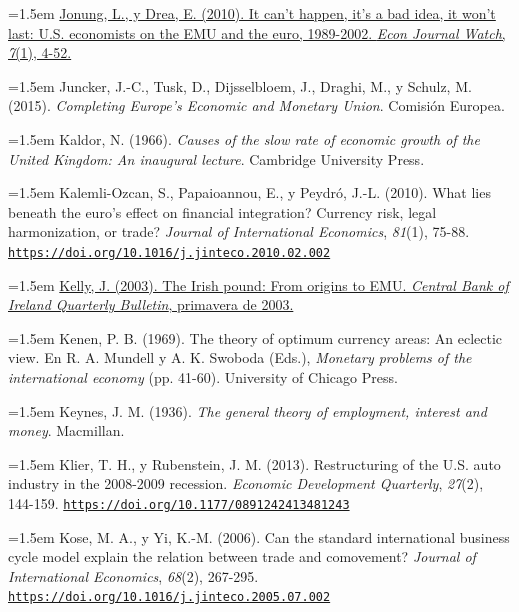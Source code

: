 \documentclass[10pt,a4paper]{article}
\begin{document}
\noindent\hangindent=1.5em \href{https://econjwatch.org/articles/it-can-t-happen-it-s-a-bad-idea-it-won-t-last-us-economists-on-the-emu-and-the-euro-1989-2002}{Jonung, L., y Drea, E. (2010). It can't happen, it's a bad idea, it won't last: U.S. economists on the EMU and the euro, 1989-2002. \textit{Econ Journal Watch}, \textit{7}(1), 4-52.}

\noindent\hangindent=1.5em Juncker, J.-C., Tusk, D., Dijsselbloem, J., Draghi, M., y Schulz, M. (2015). \textit{Completing Europe's Economic and Monetary Union}. Comisión Europea.

\noindent\hangindent=1.5em Kaldor, N. (1966). \textit{Causes of the slow rate of economic growth of the United Kingdom: An inaugural lecture}. Cambridge University Press.

\noindent\hangindent=1.5em Kalemli-Ozcan, S., Papaioannou, E., y Peydró, J.-L. (2010). What lies beneath the euro's effect on financial integration? Currency risk, legal harmonization, or trade? \textit{Journal of International Economics}, \textit{81}(1), 75-88. \href{https://doi.org/10.1016/j.jinteco.2010.02.002}{\nolinkurl{https://doi.org/10.1016/j.jinteco.2010.02.002}}

\noindent\hangindent=1.5em \href{https://centralbank.ie/docs/default-source/consumer-hub-library/the-irish-pound-from-origins-to-emu.pdf}{Kelly, J. (2003). The Irish pound: From origins to EMU. \textit{Central Bank of Ireland Quarterly Bulletin}, primavera de 2003.}

\noindent\hangindent=1.5em Kenen, P. B. (1969). The theory of optimum currency areas: An eclectic view. En R. A. Mundell y A. K. Swoboda (Eds.), \textit{Monetary problems of the international economy} (pp. 41-60). University of Chicago Press.

\noindent\hangindent=1.5em Keynes, J. M. (1936). \textit{The general theory of employment, interest and money}. Macmillan.

\noindent\hangindent=1.5em Klier, T. H., y Rubenstein, J. M. (2013). Restructuring of the U.S. auto industry in the 2008-2009 recession. \textit{Economic Development Quarterly}, \textit{27}(2), 144-159. \href{https://doi.org/10.1177/0891242413481243}{\nolinkurl{https://doi.org/10.1177/0891242413481243}}

\noindent\hangindent=1.5em Kose, M. A., y Yi, K.-M. (2006). Can the standard international business cycle model explain the relation between trade and comovement? \textit{Journal of International Economics}, \textit{68}(2), 267-295. \href{https://doi.org/10.1016/j.jinteco.2005.07.002}{\nolinkurl{https://doi.org/10.1016/j.jinteco.2005.07.002}}
\end{document}
